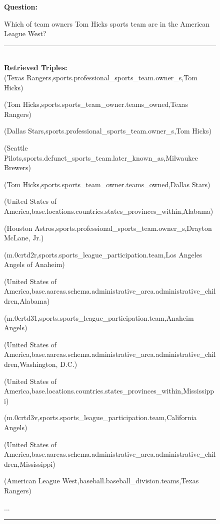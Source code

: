 \begin{figure}
\begin{tcolorbox}[colback=gray!5!white, colframe=gray!75!black, title=CWQ-WebQTrn-2152\_92fba37c9723caee68665ad9a5e4a468]
\scriptsize

\textbf{Question:}\\
\raggedright Which of team owners Tom Hicks sports team are in the American League West?

\rule{\linewidth}{0.4pt}
\\

\textbf{Retrieved Triples:}\\
(Texas Rangers,sports.professional\_sports\_team.owner\_s,Tom Hicks)

(Tom Hicks,sports.sports\_team\_owner.teams\_owned,Texas Rangers)

(Dallas Stars,sports.professional\_sports\_team.owner\_s,Tom Hicks)

(Seattle Pilots,sports.defunct\_sports\_team.later\_known\_as,Milwaukee Brewers)

(Tom Hicks,sports.sports\_team\_owner.teams\_owned,Dallas Stars)

(United States of America,base.locations.countries.states\_provinces\_within,Alabama)

(Houston Astros,sports.professional\_sports\_team.owner\_s,Drayton McLane, Jr.)

(m.0crtd2r,sports.sports\_league\_participation.team,Los Angeles Angels of Anaheim)

(United States of America,base.aareas.schema.administrative\_area.administrative\_children,Alabama)

(m.0crtd31,sports.sports\_league\_participation.team,Anaheim Angels)

(United States of America,base.aareas.schema.administrative\_area.administrative\_children,Washington, D.C.)

(United States of America,base.locations.countries.states\_provinces\_within,Mississippi)

(m.0crtd3v,sports.sports\_league\_participation.team,California Angels)

(United States of America,base.aareas.schema.administrative\_area.administrative\_children,Mississippi)

(American League West,baseball.baseball\_division.teams,Texas Rangers)

...

\rule{\linewidth}{0.4pt}
\\


\end{tcolorbox}
\end{figure}
